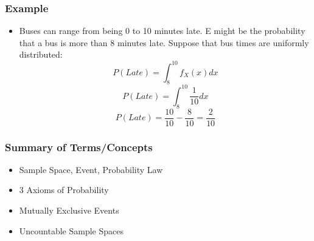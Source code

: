 \documentclass[handout]{beamer}
\numberwithin{equation}{section}
\begin{document}
\begin{frame}
\frametitle{Example} 
\begin{itemize}
\item Buses can range from being 0 to 10 minutes late.  E might be the probability that a bus is more than 8 minutes late.  Suppose that bus times are uniformly distributed:
 $$P(Late)=\int_{8}^{10} f_X(x) dx$$
 $$P(Late)=\int_{8}^{10} \frac{1}{10}dx$$
 $$P(Late)=\frac{10}{10}-\frac{8}{10}=\frac{2}{10}$$
\end{itemize}
\end{frame}



\begin{frame}
\frametitle{Summary of Terms/Concepts}
\begin{itemize}
\item Sample Space, Event, Probability Law
\item 3 Axioms of Probability 
\item Mutually Exclusive Events
\item Uncountable Sample Spaces
\end{itemize}
\end{frame}
\end{document}
